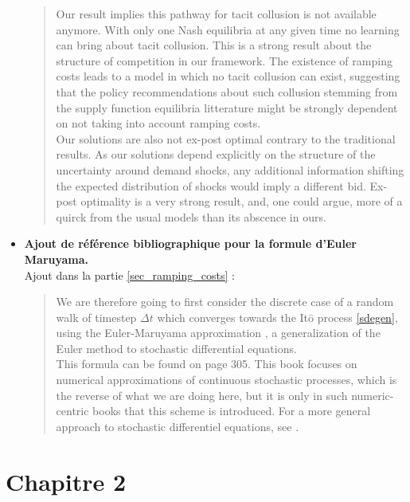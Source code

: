\documentclass{article}
\begin{document}
\begin{itemize}
\begin{quote}
Our result implies this pathway for tacit collusion is not available anymore. With only one Nash equilibria at any given time no learning can bring about tacit collusion. This is a strong result about the structure of competition in our framework. The existence of ramping costs leads to a model in which no tacit collusion can exist, suggesting that the policy recommendations about such collusion stemming from the supply function equilibria litterature might be strongly dependent on not taking into account ramping costs.\\

Our solutions are also not ex-post optimal contrary to the traditional results. As our solutions depend explicitly on the structure of the uncertainty around demand shocks, any additional information shifting the expected distribution of shocks would imply a different bid. Ex-post optimality is a very strong result, and, one could argue, more of a quirck from the usual models than its abscence in ours.
\end{quote}

\item \textbf{Ajout de référence bibliographique pour la formule d'Euler Maruyama.}\\

Ajout dans la partie \ref{sec_ramping_costs} :

\begin{quote}
We are therefore going to first consider the discrete case of a random walk of timestep $\Delta t$ which converges towards the It\={o} process \ref{sdegen}, using the Euler-Maruyama approximation \cite{kloeden2011numerical}, a generalization of the Euler method to stochastic differential equations. \\

This formula can be found on page 305. This book focuses on numerical approximations of continuous stochastic processes, which is the reverse of what we are doing here, but it is only in such numeric-centric books that this scheme is introduced. For a more general approach to stochastic differentiel equations, see \cite{oksendal2003stochastic}.
\end{quote}

\end{itemize}

\section{Chapitre 2}
\end{document}
